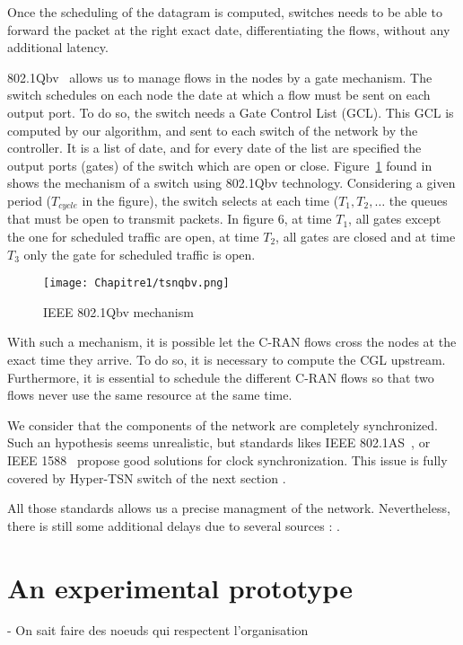 Once the scheduling of the datagram is computed, switches needs to be able to forward the packet at the right exact date, differentiating the flows, without any additional latency. 

802.1Qbv~\cite{8613095} allows us to manage flows in the nodes by a gate mechanism. The switch schedules on each node the date at which a flow must be sent on each output port. To do so, the switch needs a Gate Control List (GCL). This GCL is computed by our algorithm, and sent to each switch of the network by the controller. It is a list of date, and for every date of the list are specified the output ports (gates) of the switch which are open or close.
Figure~\ref{fig:tsnqbv} found in~\cite{durr2016no} shows the mechanism of a switch using 802.1Qbv technology. Considering a given period ($T_{cycle}$ in the figure), the switch selects at each time ($T_1 , T_2 , \ldots$ the queues that must be open to transmit packets. In figure 6, at time $T_1$, all gates except the one for scheduled traffic are open, at time $T_2$, all gates are closed and at time $T_3$ only the gate for scheduled traffic is open.
  \begin{figure}
      \begin{center}
      \texttt{[image: Chapitre1/tsnqbv.png]}
      \end{center}
      \caption{IEEE 802.1Qbv mechanism}\label{fig:tsnqbv}
      \end{figure}
      
With such a mechanism, it is possible let the C-RAN flows cross the nodes at the exact time they arrive. To do so, it is necessary to compute the CGL upstream. Furthermore, it is essential to schedule the different C-RAN flows so that two flows never use the same resource at the same time.
   
We consider that the components of the network are completely synchronized. Such an hypothesis seems unrealistic, but standards likes IEEE 802.1AS~\cite{5741898}, or IEEE 1588~\cite{4579760} propose good solutions for clock synchronization. This issue is fully covered by Hyper-TSN switch of the next section .

All those standards allows us a precise managment of the network. Nevertheless, there is still some additional delays due to several sources : .


\section{An experimental prototype}
\label{sec:platform}
- On sait faire des noeuds qui respectent l'organisation

